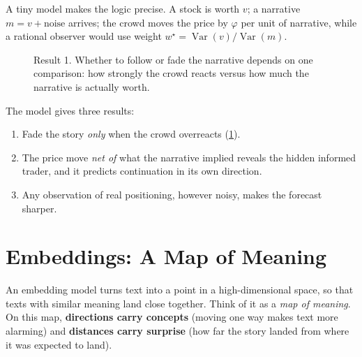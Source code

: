\documentclass[11pt,a4paper]{article}
\DeclareMathOperator{\Var}{Var}
\begin{document}
A tiny model makes the logic precise. A stock is worth $v$; a narrative $m = v + \text{noise}$ arrives; the crowd moves the price by $\varphi$ per unit of narrative, while a rational observer would use weight $w^\star = \Var(v)/\Var(m)$.

\begin{figure}[ht]
\centering
{}
\caption{Result 1. Whether to follow or fade the narrative depends on one comparison: how strongly the crowd reacts versus how much the narrative is actually worth.}
\label{fig:phi}
\end{figure}

The model gives three results:
\begin{enumerate}[label=\textbf{Result \arabic*.},leftmargin=*]
  \item Fade the story \emph{only} when the crowd overreacts (\cref{fig:phi}).
  \item The price move \emph{net of} what the narrative implied reveals the hidden informed trader, and it predicts continuation in its own direction.
  \item Any observation of real positioning, however noisy, makes the forecast sharper.
\end{enumerate}

\section{Embeddings: A Map of Meaning}

An embedding model turns text into a point in a high-dimensional space, so that texts with similar meaning land close together. Think of it as a \emph{map of meaning}. On this map, \textbf{directions carry concepts} (moving one way makes text more alarming) and \textbf{distances carry surprise} (how far the story landed from where it was expected to land).
\end{document}
